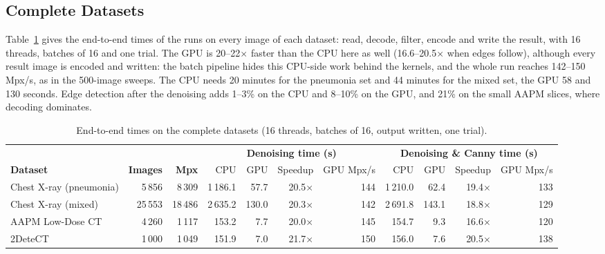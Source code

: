\documentclass[10pt,a4paper]{article}
\begin{document}
\subsection{Complete Datasets}
Table~\ref{tab:full} gives the end-to-end times of the runs on every image of each dataset: read, decode, filter, encode and write the
result, with 16 threads, batches of 16 and one trial. The GPU is 20--22$\times$ faster than the CPU here as well (16.6--20.5$\times$ when edges follow),
although every result image is encoded and written: the batch pipeline hides this CPU-side work behind the kernels, and the whole run reaches
142--150\,Mpx/s, as in the 500-image sweeps. The CPU needs 20 minutes for the pneumonia set and 44 minutes for the mixed set, the GPU 58 and 130 seconds.
Edge detection after the denoising adds 1--3\% on the CPU and 8--10\% on the GPU, and 21\% on the small AAPM slices, where decoding dominates.

\begin{table}[H]
	\centering\footnotesize
	\setlength{\tabcolsep}{5pt}
	\begin{tabular}{lrrrrrrrrrr}
		\toprule
		& & & \multicolumn{4}{c}{\textbf{Denoising time (s)}} & \multicolumn{4}{c}{\textbf{Denoising \& Canny time (s)}}\\
		\cmidrule(lr){4-7}\cmidrule(lr){8-11}
		\textbf{Dataset} & \textbf{Images} & \textbf{Mpx} & CPU & GPU & Speedup & GPU Mpx/s & CPU & GPU & Speedup & GPU Mpx/s\\
		\midrule
		Chest X-ray (pneumonia) & 5\,856 & 8\,309 & 1\,186.1 & 57.7 & 20.5$\times$ & 144 & 1\,210.0 & 62.4 & 19.4$\times$ & 133 \\
		Chest X-ray (mixed) & 25\,553 & 18\,486 & 2\,635.2 & 130.0 & 20.3$\times$ & 142 & 2\,691.8 & 143.1 & 18.8$\times$ & 129 \\
		AAPM Low-Dose CT & 4\,260 & 1\,117 & 153.2 & 7.7 & 20.0$\times$ & 145 & 154.7 & 9.3 & 16.6$\times$ & 120 \\
		2DeteCT & 1\,000 & 1\,049 & 151.9 & 7.0 & 21.7$\times$ & 150 & 156.0 & 7.6 & 20.5$\times$ & 138 \\
		\bottomrule
	\end{tabular}
	\caption{End-to-end times on the complete datasets (16 threads, batches of 16, output written, one trial).}
	\label{tab:full}
\end{table}
\end{document}

